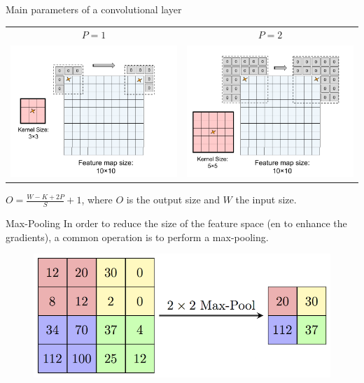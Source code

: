 \documentclass[handout]{beamer}
\begin{document}
\begin{frame}[t]{Main parameters of a convolutional layer}
\begin{itemize}
    {
    {\centering
\begin{tabular}{cc}
    $P=1$ & $P=2$ \\
    \includegraphics[trim={0 0 1.5cm 0}, clip, width=.45\textwidth]{fig/L2/pad3.png}&
    \includegraphics[trim={0 0 1.5cm 0}, clip, width=.45\textwidth]{fig/L2/pad5.png}\\
    \end{tabular}
    }

}
    
\end{itemize}
    
    {\footnotesize
    $O = \frac{W - K +2P}{S} + 1$, where $O$ is the output size and $W$ the input size.
    }
\end{frame}


\begin{frame}{Max-Pooling}
    In order to reduce the size of the feature space (en to enhance the gradients), a common operation is to perform a max-pooling.
    \begin{figure}
   \centering
    \includegraphics[width=.6\textwidth]{fig/L2/MaxpoolSample2.png}
\end{figure}
\end{frame}
\end{document}
